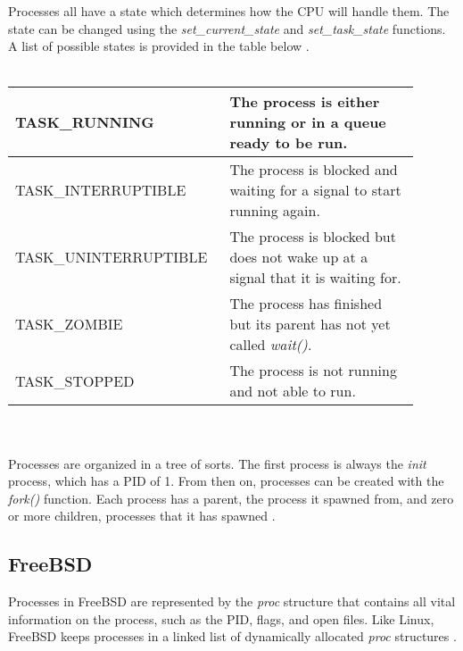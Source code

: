 \documentclass[10pt,draftclsnofoot,onecolumn,journal,compsoc]{IEEEtran}
\begin{document}
Processes all have a state which determines how the CPU will handle them. The state can be changed using the \textit{set\_current\_state} and \textit{set\_task\_state} functions. A list of possible states is provided in the table below \cite{linux_proc}. \\ \\

\begin{tabular}{ | p{0.45\linewidth} | p{0.45\linewidth} | }
    \hline
    TASK\_RUNNING & The process is either running or in a queue ready to be run. \\ \hline
    TASK\_INTERRUPTIBLE & The process is blocked and waiting for a signal to start running again. \\ \hline
    TASK\_UNINTERRUPTIBLE & The process is blocked but does not wake up at a signal that it is waiting for. \\ \hline
    TASK\_ZOMBIE & The process has finished but its parent has not yet called \textit{wait()}. \\ \hline
    TASK\_STOPPED & The process is not running and not able to run. \\ \hline
\end{tabular} \\ \\ 

Processes are organized in a tree of sorts. The first process is always the \textit{init} process, which has a PID of 1. From then on, processes can be created with the \textit{fork()} function. Each process has a parent, the process it spawned from, and zero or more children, processes that it has spawned \cite{linux_proc}.

\subsection{FreeBSD}
Processes in FreeBSD are represented by the \textit{proc} structure that contains all vital information on the process, such as the PID, flags, and open files. Like Linux, FreeBSD keeps processes in a linked list of dynamically allocated \textit{proc} structures \cite{bsd_proc}. 
\end{document}
